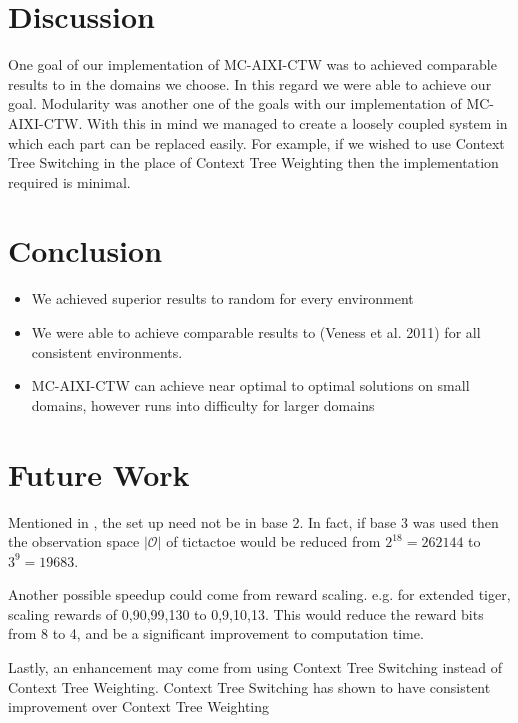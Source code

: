 \documentclass{article}
\theoremstyle{definition}
\newtheorem{primary statistics}[definition]{Primary Statistics}
\newtheorem{auxiliary statistics}[definition]{Auxiliary Statistics}
\begin{document}
\section{Discussion}


One goal of our implementation of MC-AIXI-CTW was to achieved comparable results to \citep{veness2011monte} in the domains we choose. In this regard we were able to achieve our goal. Modularity was another one of the goals with our implementation of MC-AIXI-CTW. With this in mind we managed to create a loosely coupled system in which each part can be replaced easily. For example, if we wished to use Context Tree Switching \citep{veness2012context} in the place of Context Tree Weighting then the implementation required is minimal.


\section{Conclusion}
\begin{itemize}
\item We achieved superior results to random for every environment
   \item We were able to achieve comparable results to (Veness et al. 2011) for all consistent environments.
   \item MC-AIXI-CTW can achieve near optimal to optimal solutions on small domains, however runs into difficulty for larger domains
\end{itemize}
 





\section{Future Work}

  Mentioned in \citep{veness2011monte}, the set up need not be in base 2. In fact, if base 3 was used then the observation space $|\mathcal{O}|$ of tictactoe would be reduced from $2^{18}=262144$ to $3^9 = 19683$.


  Another possible speedup could come from reward scaling.  e.g. for extended tiger, scaling rewards of 0,90,99,130 to 0,9,10,13. This would reduce the reward bits from 8 to 4, and be a significant improvement to computation time.
  
  Lastly, an enhancement may come from using Context Tree Switching instead of Context Tree Weighting. Context Tree Switching \citep{veness2012context} has shown to have consistent improvement over Context Tree Weighting
  

\printbibliography
\end{document}
